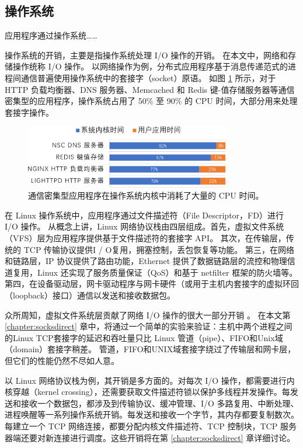 \subsection{操作系统}

应用程序通过操作系统……

操作系统的开销，主要是指操作系统处理 I/O 操作的开销。
在本文中，网络和存储操作统称 I/O 操作。
以网络操作为例，分布式应用程序基于消息传递范式的进程间通信普遍使用操作系统中的套接字（socket）原语。
如图 \ref{background:fig:kernel_time} 所示，对于 HTTP 负载均衡器、DNS 服务器、Memcached \cite{memcached} 和 Redis \cite{redis} 键-值存储服务器等通信密集型的应用程序，操作系统占用了 50\% 至 90\% 的 CPU 时间，大部分用来处理套接字操作。


\begin{figure}[htbp]
	\centering
	\includegraphics[width=0.8\textwidth]{figures/kernel_time.pdf}
	\caption{通信密集型应用程序在操作系统内核中消耗了大量的 CPU 时间。}
	\label{background:fig:kernel_time}
\end{figure}

在 Linux 操作系统中，应用程序通过文件描述符（File Descriptor，FD）进行 I/O 操作。
从概念上讲，Linux 网络协议栈由四层组成。首先，虚拟文件系统（VFS）层为应用程序提供基于文件描述符的套接字 API。
其次，在传输层，传统的 TCP 传输协议提供I / O复用，拥塞控制，丢包恢复等功能。
第三，在网络和链路层，IP 协议提供了路由功能，Ethernet 提供了数据链路层的流控和物理信道复用，Linux 还实现了服务质量保证（QoS）和基于 netfilter 框架的防火墙等。
第四，在设备驱动层，网卡驱动程序与网卡硬件（或用于主机内套接字的虚拟环回（loopback）接口）通信以发送和接收数据包。

众所周知，虚拟文件系统层贡献了网络 I/O 操作的很大一部分开销 \cite {clark1989analysis,boyd2010analysis}。
在本文第 \ref{chapter:socksdirect} 章中，将通过一个简单的实验来验证：主机中两个进程之间的Linux TCP套接字的延迟和吞吐量只比 Linux 管道（pipe）、FIFO和Unix域（domain）套接字稍差。
管道，FIFO和UNIX域套接字绕过了传输层和网卡层，但它们的性能仍然不尽如人意。

以 Linux 网络协议栈为例，其开销是多方面的。对每次 I/O 操作，都需要进行内核穿越（kernel crossing），还需要获取文件描述符锁以保护多线程并发操作。每发送和接收一个数据包，都涉及到传输协议、缓冲管理、I/O 多路复用、中断处理、进程唤醒等一系列操作系统开销。每发送和接收一个字节，其内存都要复制数次。每建立一个 TCP 网络连接，都要分配内核文件描述符、TCP 控制块，TCP 服务器端还要对新连接进行调度。这些开销将在第 \ref{chapter:socksdirect} 章详细讨论。

